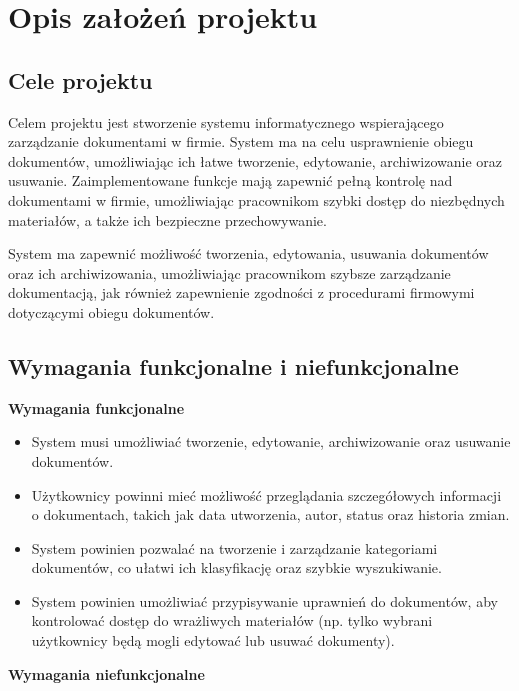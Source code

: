 \chapter{Opis założeń projektu}

\section{Cele projektu}
Celem projektu jest stworzenie systemu informatycznego wspierającego zarządzanie dokumentami w firmie. System ma na celu usprawnienie obiegu dokumentów, umożliwiając ich łatwe tworzenie, edytowanie, archiwizowanie oraz usuwanie. Zaimplementowane funkcje mają zapewnić pełną kontrolę nad dokumentami w firmie, umożliwiając pracownikom szybki dostęp do niezbędnych materiałów, a także ich bezpieczne przechowywanie.

System ma zapewnić możliwość tworzenia, edytowania, usuwania dokumentów oraz ich archiwizowania, umożliwiając pracownikom szybsze zarządzanie dokumentacją, jak również zapewnienie zgodności z procedurami firmowymi dotyczącymi obiegu dokumentów.

\section{Wymagania funkcjonalne i niefunkcjonalne}

\noindent \textbf{Wymagania funkcjonalne}

\begin{itemize}
    \item System musi umożliwiać tworzenie, edytowanie, archiwizowanie oraz usuwanie dokumentów.
    \item Użytkownicy powinni mieć możliwość przeglądania szczegółowych informacji o dokumentach, takich jak data utworzenia, autor, status oraz historia zmian.
    \item System powinien pozwalać na tworzenie i zarządzanie kategoriami dokumentów, co ułatwi ich klasyfikację oraz szybkie wyszukiwanie.
    \item System powinien umożliwiać przypisywanie uprawnień do dokumentów, aby kontrolować dostęp do wrażliwych materiałów (np. tylko wybrani użytkownicy będą mogli edytować lub usuwać dokumenty).
\end{itemize}

\noindent \textbf{Wymagania niefunkcjonalne}

